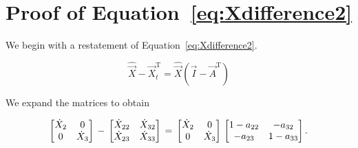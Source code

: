 %
%
%

\chapter{Proof of Equation~\ref{eq:Xdifference2}}
\label{app:B} 



We begin with a restatement of Equation~\ref{eq:Xdifference2}.

\begin{equation} \label{eq:Xdifference2Proof-1}
	\hat{\vec{X}} - \vec{X}_t^\mathrm{T} = \hat{\vec{X}}(\vec{I} - \vec{A}^\mathrm{T})
\end{equation}

\noindent We expand the matrices to obtain

\begin{equation} \label{eq:Xdifference2Proof-2}
\begin{bmatrix} 	\dot{X}_{2} & 0	\\
				0 & \dot{X}_{3}	\\
\end{bmatrix} \\
 - \\
\begin{bmatrix} 	\dot{X}_{22} & \dot{X}_{32}	\\
				\dot{X}_{23} & \dot{X}_{33}	\\
\end{bmatrix} \\
= \\
\begin{bmatrix} 	\dot{X}_{2} & 0	\\
				0 & \dot{X}_{3}	\\
\end{bmatrix} \\
\begin{bmatrix} 	1 - a_{22} & -a_{32}	\\
				-a_{23} & 1 - a_{33}	\\
\end{bmatrix}.
\end{equation}

